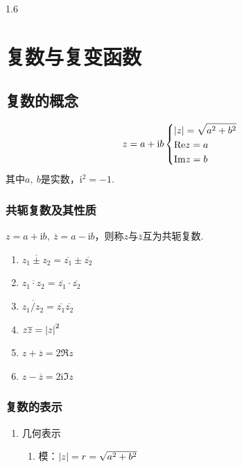 \documentclass[lang=cn,10pt]{elegantbook}
\renewcommand{\i}{\mathrm{i}}
\begin{document}
\begin{spacing}{1.6}
\chapter{复数与复变函数}
\section{复数的概念}
\begin{definition}
$$
z=a+\i b\left\{
\begin{aligned}
&\abs{z}=\sqrt{a^2+b^2}\\
&\mathrm{Re}z=a\\
&\mathrm{Im}z=b
\end{aligned}
\right.
$$
其中$a,\ b$是实数，$\i^2=-1$.
\end{definition}
\subsection{共轭复数及其性质}
$z=a+\i b,\ \overline{z}=a-\i b$，则称$z$与$\overline{z}$互为共轭复数.
\begin{enumerate}
    \item $\overline{z_1\pm z_2}=\overline{z_1}\pm\overline{z_2}$
    \item $\overline{z_1\cdot z_2}=\overline{z_1}\cdot\overline{z_2}$
    \item $\overline{z_1/z_2}=\overline{z_1}\overline{z_2}$
    \item $z\overline{z}=\abs{z}^2$
    \item$z+\overline{z}=2\Re z$
    \item$z-\overline{z}=2\i\Im z$
    
\end{enumerate}
\subsection{复数的表示}
\begin{enumerate}
    \item 几何表示
    \begin{center}
\end{center}
\begin{enumerate}[(1)]
    \item 模：$\abs{z}=r=\sqrt{a^2+b^2}$
\begin{property}


\end{property}
\end{enumerate}
\end{enumerate}
\end{spacing}
\end{document}
